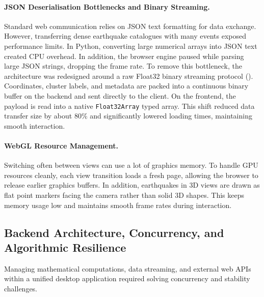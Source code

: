 \paragraph{JSON Deserialisation Bottlenecks and Binary Streaming.}
Standard web communication relies on JSON text formatting for data exchange. However, transferring dense earthquake catalogues with many events exposed performance limits. In Python, converting large numerical arrays into JSON text created CPU overhead. In addition, the browser engine paused while parsing large JSON strings, dropping the frame rate. To remove this bottleneck, the architecture was redesigned around a raw Float32 binary streaming protocol (). Coordinates, cluster labels, and metadata are packed into a continuous binary buffer on the backend and sent directly to the client. On the frontend, the payload is read into a native \texttt{Float32Array} typed array. This shift reduced data transfer size by about 80\% and significantly lowered loading times, maintaining smooth interaction.

\paragraph{WebGL Resource Management.}
Switching often between views can use a lot of graphics memory. To handle GPU resources cleanly, each view transition loads a fresh page, allowing the browser to release earlier graphics buffers. In addition, earthquakes in 3D views are drawn as flat point markers facing the camera rather than solid 3D shapes. This keeps memory usage low and maintains smooth frame rates during interaction.

\subsection{Backend Architecture, Concurrency, and Algorithmic Resilience}
\label{sec:challenge-concurrency}
\label{sec:challenge-flickering}
\label{sec:challenge-ipc}
\label{sec:challenge-ingv}
\label{sec:challenge-memory}

Managing mathematical computations, data streaming, and external web APIs within a unified desktop application required solving concurrency and stability challenges.

